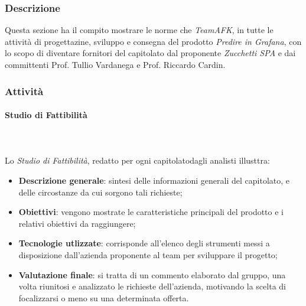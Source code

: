 		\subsubsection{Descrizione}
		Questa sezione ha il compito mostrare le norme che \textit{TeamAFK}, in tutte le attività di progettazine, sviluppo e consegna del prodotto \textit{Predire in Grafana}, con lo scopo di diventare fornitori del capitolato  dal proponente \textit{Zucchetti SPA} e dai committenti Prof. Tullio Vardanega e Prof. Riccardo Cardin.
		\subsubsection{Attività}
			\paragraph{Studio di Fattibilità} \mbox{} \\ \mbox{} \\
			Lo \textit{Studio di Fattibilità}, redatto per ogni capitolato\glo dagli analisti illusttra:
			\begin{itemize}
				\item \textbf{Descrizione generale}: sintesi delle informazioni generali del capitolato, e delle circostanze da cui sorgono tali richieste;
				\item \textbf{Obiettivi}: vengono mostrate le caratteristiche principali del prodotto e i relativi obiettivi da raggiungere;
				\item \textbf{Tecnologie utlizzate}: corrisponde all'elenco degli strumenti messi a disposizione dall'azienda proponente al team per sviluppare il progetto;
				\item \textbf{Valutazione finale}: si tratta di un commento elaborato dal gruppo, una volta riunitosi e analizzato le  richieste dell'azienda, motivando la scelta di focalizzarsi o meno su una determinata offerta.
			\end{itemize}

